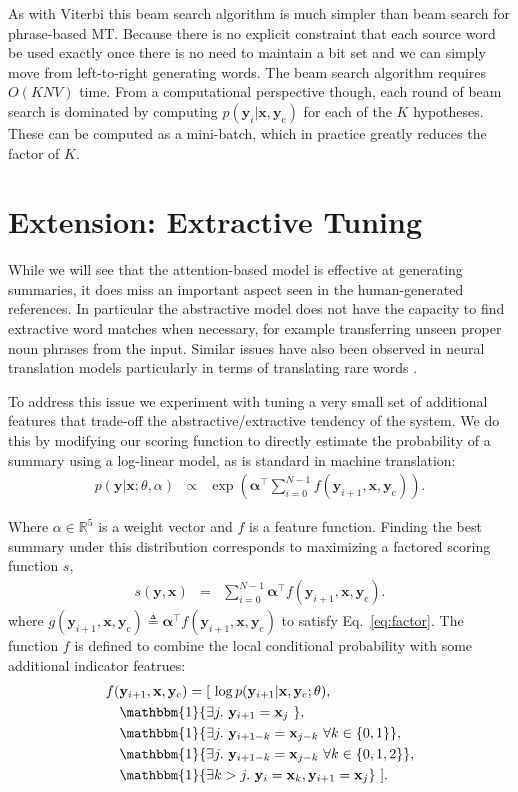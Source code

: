 \documentclass[11pt,a4paper]{article}
\newcommand{\xvec}{\mathbf{x}}
\newcommand{\yvec}{\mathbf{y}}
\newcommand{\context}{\mathbf{y}_{\mathrm{c}}}
\newcommand{\reals}{\mathbb{R}}
\begin{document}
As with Viterbi this beam search algorithm is much simpler than beam
search for phrase-based MT. Because there is no explicit constraint
that each source word be used exactly once there is no need to
maintain a bit set and we can simply move from left-to-right generating
words. The beam search algorithm requires $O(KNV)$ time. From a
computational perspective though, each round of beam search is
dominated by computing $p(\yvec_i | \xvec, \context)$ for each of the
$K$ hypotheses. These can be computed as a mini-batch, which 
in practice greatly reduces the factor of $K$.


\section{Extension: Extractive Tuning}
\label{sec:tuning}

While we will see that the attention-based model is effective at
generating summaries, it does miss an important aspect seen in
the human-generated references. In particular the abstractive model
does not have the capacity to find extractive word matches when
necessary, for example transferring unseen proper noun phrases from the
input. Similar issues have also been observed in neural
translation models particularly in terms of translating rare words
\cite{luong2014addressing}.


To address this issue we experiment with tuning a very small set of
additional features that trade-off the abstractive/extractive 
tendency of the system. We do this by modifying our scoring function to 
directly estimate the probability of a summary using a log-linear model,
as is standard in machine translation:
\begin{eqnarray*} 
p(\yvec | \xvec;\theta, \alpha ) &\propto& \exp( \mathbf{\alpha}^\top \sum_{i = 0}^{N-1} f(\yvec_{i+1}, \xvec, \context) ).
\end{eqnarray*}

\noindent Where $\alpha \in \reals^5$ is a weight vector and $f$ is a feature function. Finding the best summary under this distribution corresponds to maximizing a factored scoring function $s$,
\begin{eqnarray*} 
 s(\yvec, \xvec) &=&   \sum_{i = 0}^{N-1} \mathbf{\alpha}^\top  f(\yvec_{i+1}, \xvec, \context) . 
\end{eqnarray*}
\noindent where $g(\yvec_{i+1}, \xvec, \context) \triangleq \mathbf{\alpha}^\top  f(\yvec_{i+1}, \xvec, \context)$ to satisfy Eq.~\ref{eq:factor}.
The function $f$ is defined to combine the local conditional probability with some additional indicator featrues:  
\begin{align*}
f(&\yvec_{i+1}, \xvec, \context)  = [\ \log p(\yvec_{i+1} | \xvec, \context; \theta),  \\
 &\mathbbm{1}\{\exists j.\ \yvec_{i+1} = \xvec_{j}\ \}, \\
 &\mathbbm{1}\{\exists j.\ \yvec_{i+1-k} = \xvec_{j-k}\ \forall k\in\{0,1\}\},  \\
 &\mathbbm{1}\{\exists j.\ \yvec_{i+1-k} = \xvec_{j-k}\ \forall k\in\{0,1,2\} \}, \\
 &\mathbbm{1}\{\exists k>j.\ \yvec_{i} = \xvec_{k}, \yvec_{i+1} = \xvec_j\}\ ].
\end{align*}
\end{document}
